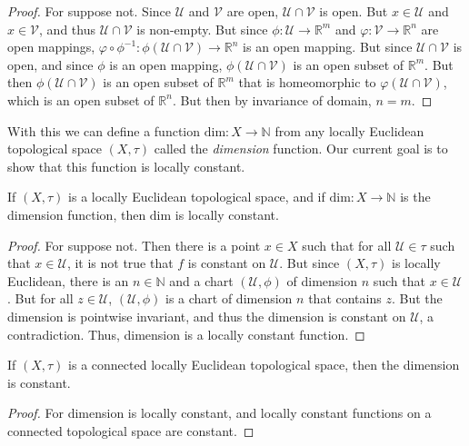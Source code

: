 \documentclass[oneside]{book}                                                  %
\begin{document}
            \begin{proof}
                For suppose not. Since $\mathcal{U}$ and $\mathcal{V}$ are open,
                $\mathcal{U}\cap\mathcal{V}$ is open. But $x\in\mathcal{U}$ and
                $x\in\mathcal{V}$, and thus $\mathcal{U}\cap\mathcal{V}$ is
                non-empty. But since $\phi:\mathcal{U}\rightarrow\mathbb{R}^{m}$
                and $\varphi:\mathcal{V}\rightarrow\mathbb{R}^{n}$ are open
                mappings,
                $\varphi\circ\phi^{\minus{1}}:\phi(\mathcal{U}\cap\mathcal{V})%
                 \rightarrow\mathbb{R}^{n}$ is an open mapping. But since
                $\mathcal{U}\cap\mathcal{V}$ is open, and since $\phi$ is an
                open mapping, $\phi(\mathcal{U}\cap\mathcal{V})$ is an open
                subset of $\mathbb{R}^{m}$. But then
                $\phi(\mathcal{U}\cap\mathcal{V})$ is an open subset of
                $\mathbb{R}^{m}$ that is homeomorphic to
                $\varphi(\mathcal{U}\cap\mathcal{V})$, which is an open subset
                of $\mathbb{R}^{n}$. But then by invariance of domain, $n=m$.
            \end{proof}
            With this we can define a function
            $\textrm{dim}:X\rightarrow\mathbb{N}$ from any locally Euclidean
            topological space $(X,\tau)$ called the \textit{dimension} function.
            Our current goal is to show that this function is locally constant.
            \begin{theorem}
                If $(X,\tau)$ is a locally Euclidean topological space, and if
                $\textrm{dim}:X\rightarrow\mathbb{N}$ is the dimension function,
                then $\textrm{dim}$ is locally constant.
            \end{theorem}
            \begin{proof}
                For suppose not. Then there is a point $x\in{X}$ such that for
                all $\mathcal{U}\in\tau$ such that $x\in\mathcal{U}$, it is not
                true that $f$ is constant on $\mathcal{U}$. But since $(X,\tau)$
                is locally Euclidean, there is an $n\in\mathbb{N}$ and a chart
                $(\mathcal{U},\phi)$ of dimension $n$ such that
                $x\in\mathcal{U}$. But for all $z\in\mathcal{U}$,
                $(\mathcal{U},\phi)$ is a chart of dimension $n$ that contains
                $z$. But the dimension is pointwise invariant, and thus the
                dimension is constant on $\mathcal{U}$, a contradiction. Thus,
                dimension is a locally constant function.
            \end{proof}
            \begin{theorem}
                If $(X,\tau)$ is a connected locally Euclidean topological
                space, then the dimension is constant.
            \end{theorem}
            \begin{proof}
                For dimension is locally constant, and locally constant
                functions on a connected topological space are constant.
            \end{proof}
\end{document}
